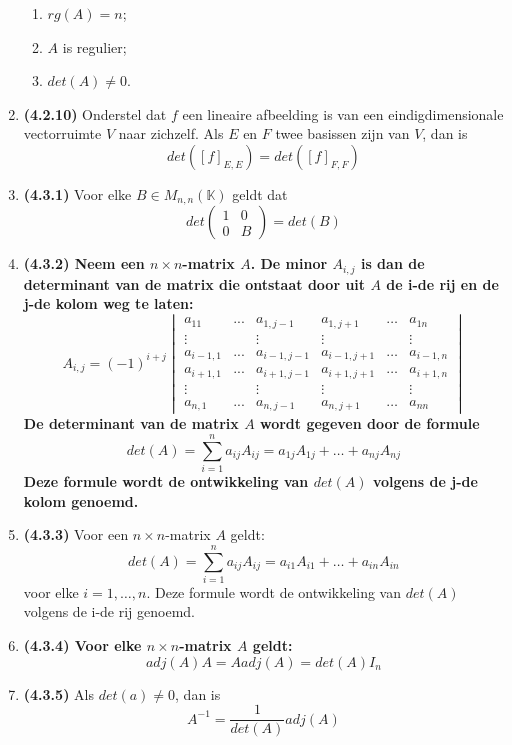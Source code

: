 \documentclass[12pt]{article}
\begin{document}
\begin{enumerate}
\begin{enumerate}
            \item $rg(A)=n$;
            \item $A$ is regulier;
            \item $det(A) \neq 0$.
        \end{enumerate}
        \item \textbf{(4.2.10)} Onderstel dat $f$ een lineaire afbeelding is van een eindigdimensionale vectorruimte $V$ naar zichzelf. Als $E$ en $F$ twee basissen zijn van $V$, dan is $$det([f]_{E,E})=det([f]_{F,F})$$
        \item \textbf{(4.3.1)} Voor elke $B \in M_{n,n}(\mathbb{K})$ geldt dat $$det \begin{pmatrix}
            1 & 0 \\
            0 & B
        \end{pmatrix}=det(B)$$
        \item \textbf{\textbf{(4.3.2)} Neem een $n \times n$-matrix $A$. De minor $A_{i,j}$ is dan de determinant van de matrix die ontstaat door uit $A$ de i-de rij en de j-de kolom weg te laten: $$A_{i,j}=(-1)^{i+j} \begin{vmatrix}
            a_{11} & ... & a_{1,j-1} & a_{1,j+1} & \dots & a_{1n} \\
            \vdots & & \vdots & \vdots & & \vdots \\
            a_{i-1,1} & ... & a_{i-1,j-1} & a_{i-1,j+1} & \dots & a_{i-1,n} \\
            a_{i+1,1} & ... & a_{i+1,j-1} & a_{i+1,j+1} & \dots & a_{i+1,n} \\
            \vdots & & \vdots & \vdots & & \vdots \\
            a_{n,1} & ... & a_{n,j-1} & a_{n,j+1} & \dots & a_{nn} 
        \end{vmatrix}$$ De determinant van de matrix $A$ wordt gegeven door de formule $$det(A)=\sum_{i=1}^n a_{ij}A_{ij}= a_{1j}A_{1j}+\dots+a_{nj}A_{nj}$$ Deze formule wordt de ontwikkeling van $det(A)$ volgens de j-de kolom genoemd.}
        \item \textbf{(4.3.3)} Voor een $n \times n$-matrix $A$ geldt: $$det(A)=\sum_{i=1}^n a_{ij}A_{ij}= a_{i1}A_{i1}+\dots+a_{in}A_{in}$$ voor elke $i=1,\dots,n$. Deze formule wordt de ontwikkeling van $det(A)$ volgens de i-de rij genoemd.
        \item \textbf{\textbf{(4.3.4)} Voor elke $n \times n$-matrix $A$ geldt: $$adj(A)A=Aadj(A)=det(A)I_n$$}
        \item \textbf{(4.3.5)} Als $det(a)\neq 0$, dan is $$A^{-1}= \frac{1}{det(A)}adj(A)$$

\end{enumerate}
\end{document}

